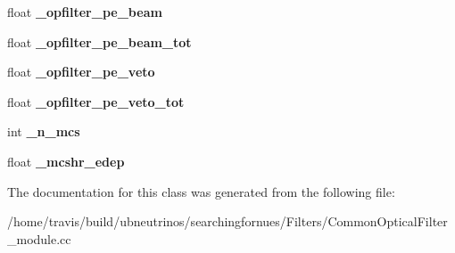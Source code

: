 \begin{DoxyCompactItemize}
\item 
float {\bfseries \+\_\+opfilter\+\_\+pe\+\_\+beam}\hypertarget{classCommonOpticalFilter_ada83cac25db1c34a32a052f306a5d994}{}\label{classCommonOpticalFilter_ada83cac25db1c34a32a052f306a5d994}

\item 
float {\bfseries \+\_\+opfilter\+\_\+pe\+\_\+beam\+\_\+tot}\hypertarget{classCommonOpticalFilter_a89ac8cb77d6821567d434b662be81257}{}\label{classCommonOpticalFilter_a89ac8cb77d6821567d434b662be81257}

\item 
float {\bfseries \+\_\+opfilter\+\_\+pe\+\_\+veto}\hypertarget{classCommonOpticalFilter_ac4bcde210f0c9b8e672e60d6fbd99915}{}\label{classCommonOpticalFilter_ac4bcde210f0c9b8e672e60d6fbd99915}

\item 
float {\bfseries \+\_\+opfilter\+\_\+pe\+\_\+veto\+\_\+tot}\hypertarget{classCommonOpticalFilter_a18702fe52e59501c913cc7a1c5c64374}{}\label{classCommonOpticalFilter_a18702fe52e59501c913cc7a1c5c64374}

\item 
int {\bfseries \+\_\+n\+\_\+mcs}\hypertarget{classCommonOpticalFilter_a66994974ea5877849ba5ab3e8cd826de}{}\label{classCommonOpticalFilter_a66994974ea5877849ba5ab3e8cd826de}

\item 
float {\bfseries \+\_\+mcshr\+\_\+edep}\hypertarget{classCommonOpticalFilter_ab677aab9e2b4d5dafd40801c1f93a947}{}\label{classCommonOpticalFilter_ab677aab9e2b4d5dafd40801c1f93a947}

\end{DoxyCompactItemize}


The documentation for this class was generated from the following file\+:\begin{DoxyCompactItemize}
\item 
/home/travis/build/ubneutrinos/searchingfornues/\+Filters/Common\+Optical\+Filter\+\_\+module.\+cc\end{DoxyCompactItemize}
